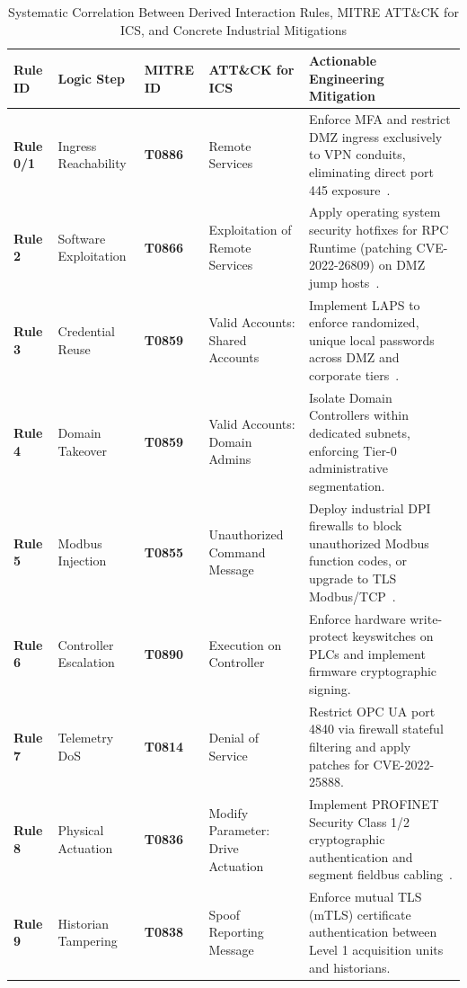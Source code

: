 \documentclass[target=mst,aauheader=aics,style=]{thud}
\begin{document}
\begin{table}[htbp]
\centering
\scriptsize
\caption{Systematic Correlation Between Derived Interaction Rules, MITRE ATT\&CK for ICS, and Concrete Industrial Mitigations}
\label{tab:mitre_ics_correlation}
\begin{tabularx}{\textwidth}{L{1.4cm}L{1.8cm}L{1.2cm}L{3.0cm}Y}
\toprule
\textbf{Rule ID} & \textbf{Logic Step} & \textbf{MITRE ID} & \textbf{ATT\&CK for ICS} & \textbf{Actionable Engineering Mitigation} \\
\midrule
\textbf{Rule 0/1} & Ingress Reachability & \textbf{T0886} & Remote Services & Enforce MFA and restrict DMZ ingress exclusively to VPN conduits, eliminating direct port 445 exposure~\cite{mitre_ics}. \\
\addlinespace
\textbf{Rule 2} & Software Exploitation & \textbf{T0866} & Exploitation of Remote Services & Apply operating system security hotfixes for RPC Runtime (patching CVE-2022-26809) on DMZ jump hosts~\cite{Ou05}. \\
\addlinespace
\textbf{Rule 3} & Credential Reuse & \textbf{T0859} & Valid Accounts: Shared Accounts & Implement LAPS to enforce randomized, unique local passwords across DMZ and corporate tiers~\cite{SunderOT}. \\
\addlinespace
\textbf{Rule 4} & Domain Takeover & \textbf{T0859} & Valid Accounts: Domain Admins & Isolate Domain Controllers within dedicated subnets, enforcing Tier-0 administrative segmentation. \\
\addlinespace
\textbf{Rule 5} & Modbus Injection & \textbf{T0855} & Unauthorized Command Message & Deploy industrial DPI firewalls to block unauthorized Modbus function codes, or upgrade to TLS Modbus/TCP~\cite{StanExtended}. \\
\addlinespace
\textbf{Rule 6} & Controller Escalation & \textbf{T0890} & Execution on Controller & Enforce hardware write-protect keyswitches on PLCs and implement firmware cryptographic signing. \\
\addlinespace
\textbf{Rule 7} & Telemetry DoS & \textbf{T0814} & Denial of Service & Restrict OPC UA port 4840 via firewall stateful filtering and apply patches for CVE-2022-25888. \\
\addlinespace
\textbf{Rule 8} & Physical Actuation & \textbf{T0836} & Modify Parameter: Drive Actuation & Implement PROFINET Security Class 1/2 cryptographic authentication and segment fieldbus cabling~\cite{StanExtended}. \\
\addlinespace
\textbf{Rule 9} & Historian Tampering & \textbf{T0838} & Spoof Reporting Message & Enforce mutual TLS (mTLS) certificate authentication between Level 1 acquisition units and historians. \\
\bottomrule
\end{tabularx}
\end{table}
\end{document}
